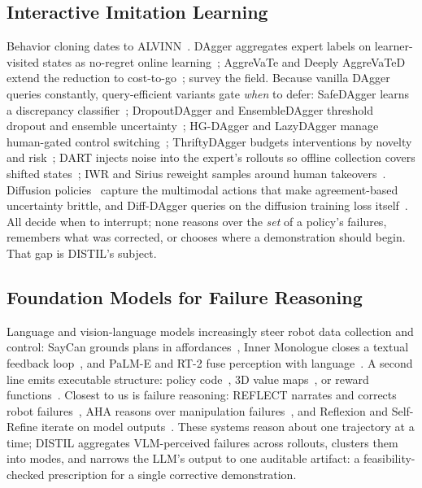 \documentclass[letterpaper]{article} %
\begin{document}
\subsection{Interactive Imitation Learning}
Behavior cloning dates to ALVINN~\citep{pomerleau1988alvinn,
pomerleau1991efficient}. DAgger aggregates expert labels on
learner-visited states as no-regret online
learning~\citep{ross2011dagger}; AggreVaTe and Deeply AggreVaTeD extend the
reduction to cost-to-go~\citep{ross2014aggrevate,sun2017aggrevated};
\citet{celemin2022iil} survey the field. Because vanilla DAgger queries
constantly, query-efficient variants gate \emph{when} to defer: SafeDAgger
learns a discrepancy classifier~\citep{zhang2017safedagger}; DropoutDAgger and
EnsembleDAgger threshold dropout and ensemble
uncertainty~\citep{menda2017dropoutdagger,menda2019ensembledagger,gal2016dropout,
lakshminarayanan2017ensembles}; HG-DAgger and LazyDAgger manage human-gated
control switching~\citep{kelly2019hgdagger,hoque2021lazydagger};
ThriftyDAgger budgets interventions by novelty and
risk~\citep{hoque2021thriftydagger}; DART injects noise into the expert's rollouts so offline
collection covers shifted states~\citep{laskey2017dart}; IWR and Sirius reweight samples
around human takeovers~\citep{mandlekar2020iwr,liu2023sirius}. Diffusion
policies~\citep{chi2023diffusionpolicy,ho2020ddpm,janner2022diffuser} capture
the multimodal actions that make agreement-based uncertainty brittle, and
Diff-DAgger queries on the diffusion training loss
itself~\citep{lee2025diffdagger}. All decide when to interrupt; none reasons
over the \emph{set} of a policy's failures, remembers what was corrected, or
chooses where a demonstration should begin. That gap is DISTIL's subject.

\subsection{Foundation Models for Failure Reasoning}
Language and vision-language models increasingly steer robot data collection
and control: SayCan grounds plans in affordances~\citep{ahn2022saycan}, Inner
Monologue closes a textual feedback loop~\citep{huang2022innermonologue}, and
PaLM-E and RT-2 fuse perception with language~\citep{driess2023palme,
brohan2023rt2}. A second line emits executable structure: policy
code~\citep{liang2023codeaspolicies,singh2023progprompt}, 3D value
maps~\citep{huang2023voxposer}, or reward
functions~\citep{ma2024eureka}. Closest to us is
failure reasoning: REFLECT narrates and corrects robot
failures~\citep{liu2023reflect}, AHA reasons over manipulation
failures~\citep{duan2025aha}, and Reflexion and Self-Refine iterate on model
outputs~\citep{shinn2023reflexion,madaan2023selfrefine}. These systems reason
about one trajectory at a time; DISTIL aggregates VLM-perceived failures
across rollouts, clusters them into modes, and narrows the LLM's output to
one auditable artifact: a feasibility-checked prescription for a single
corrective demonstration.
\end{document}
